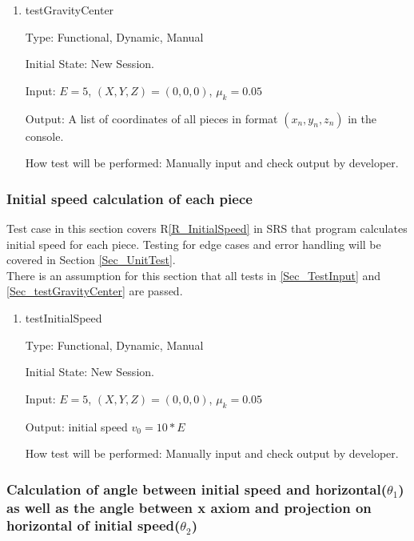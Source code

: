 \documentclass[12pt, titlepage]{article}
\newcommand{\rref}[1]{R\ref{#1}}
\begin{document}
\begin{enumerate}

\item{testGravityCenter\\}

Type: Functional, Dynamic, Manual

Initial State: New Session.

Input: $E = 5$, $(X,Y,Z) = (0,0,0)$, $\mu_{k} = 0.05$  

Output: A list of coordinates of all pieces in format $(x_{n},y_{n},z_{n})$ in the console.

How test will be performed: Manually input and check output by developer.

\end{enumerate}

\subsubsection{Initial speed calculation of each piece}
\label{Sec_TestForInitialSpeed}

Test case in this section covers \rref{R_InitialSpeed} in SRS that program calculates initial speed for each piece. Testing for edge cases and error handling will be covered in Section \ref{Sec_UnitTest}.\\
There is an assumption for this section that all tests in \ref{Sec_TestInput} and \ref{Sec_testGravityCenter} are passed.
\begin{enumerate}

\item{testInitialSpeed\\}

Type: Functional, Dynamic, Manual

Initial State: New Session.

Input: $E = 5$, $(X,Y,Z) = (0,0,0)$, $\mu_{k} = 0.05$  

Output: initial speed $v_{0} = 10 * E$

How test will be performed: Manually input and check output by developer.

\end{enumerate}

\subsubsection{Calculation of angle between initial speed and horizontal($\theta _{1}$) as well as the angle between x axiom and projection on horizontal of initial speed($\theta _{2}$)}
\label{Sec_TestForAngle}
\end{document}
